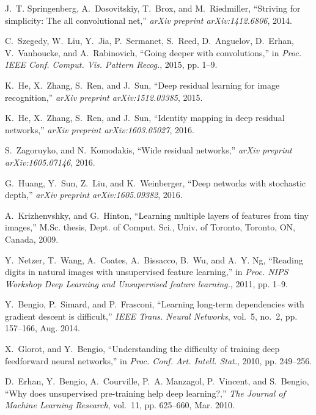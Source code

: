 \documentclass[journal]{IEEEtran}
\begin{document}
\begin{thebibliography}{1}
J.~T. Springenberg, A.~Dosovitskiy, T.~Brox, and M.~Riedmiller, ``Striving for simplicity: The all convolutional net,'' \emph{arXiv preprint arXiv:1412.6806}, 2014. 

C.~Szegedy, W.~Liu, Y.~Jia, P.~Sermanet, S.~Reed, D.~Anguelov, D.~Erhan, V.~Vanhoucke, and A.~Rabinovich, ``Going deeper with convolutions,'' in
  \emph{Proc. IEEE Conf. Comput. Vis. Pattern Recog.}, 2015, pp. 1--9.

K.~He, X.~Zhang, S.~Ren, and J.~Sun, ``Deep residual learning for image recognition,'' \emph{arXiv preprint arXiv:1512.03385}, 2015. 

K.~He, X.~Zhang, S.~Ren, and J.~Sun, ``Identity mapping in deep residual networks,'' \emph{arXiv preprint arXiv:1603.05027}, 2016. 

S.~Zagoruyko, and N.~Komodakis, ``Wide residual networks,'' \emph{arXiv preprint arXiv:1605.07146}, 2016. 

G.~Huang, Y.~Sun, Z.~Liu, and K.~Weinberger, ``Deep networks with stochastic depth,'' \emph{arXiv preprint arXiv:1605.09382}, 2016. 

A.~Krizhenvshky, and G.~Hinton, ``Learning multiple layers of features from tiny images,'' M.Sc. thesis, Dept. of Comput. Sci., Univ. of Toronto, Toronto, ON, Canada, 2009.

Y.~Netzer, T.~Wang, A.~Coates, A.~Bissacco, B.~Wu, and A.~Y. Ng, ``Reading digits in natural images with unsupervised feature learning,'' in
  \emph{Proc. NIPS Workshop Deep Learning and Unsupervised feature learning.}, 2011, pp. 1--9.



Y.~Bengio, P.~Simard, and P.~Frasconi, ``Learning long-term dependencies with gradient descent is difficult,'' \emph{IEEE Trans. Neural Networks}, vol.~5, no.~2,
  pp. 157--166, Aug. 2014.

X.~Glorot, and Y.~Bengio, ``Understanding the difficulty of training deep feedforward neural networks,'' in
  \emph{Proc. Conf. Art. Intell. Stat.}, 2010, pp. 249--256.

D.~Erhan, Y.~Bengio, A.~Courville, P.~A. Manzagol, P.~Vincent, and S.~Bengio, ``Why does unsupervised pre-training help deep learning?,'' \emph{The Journal of Machine Learning Research}, vol.~11,
  pp. 625--660, Mar. 2010.


\end{thebibliography}
\end{document}

